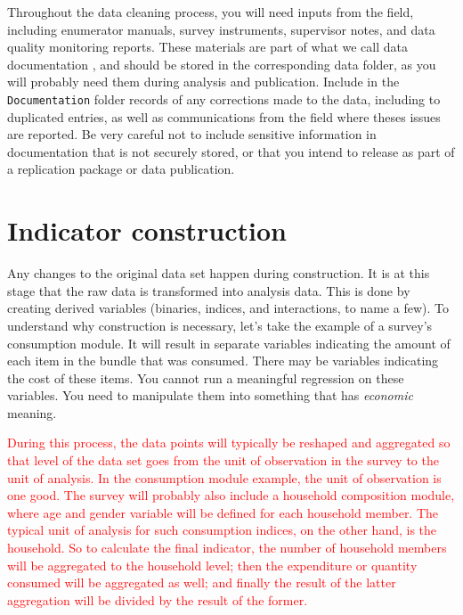 Throughout the data cleaning process, you will need inputs from the field, 
including enumerator manuals, survey instruments, 
supervisor notes, and data quality monitoring reports.
These materials are part of what we call data documentation
,
and should be stored in the corresponding data folder, 
as you will probably need them during analysis and publication.
Include in the \texttt{Documentation} folder records of any
corrections made to the data, including to duplicated entries,
as well as communications from the field where theses issues are reported.
Be very careful not to include sensitive information in 
documentation that is not securely stored, 
or that you intend to release as part of a replication package or data publication.

\section{Indicator construction}

Any changes to the original data set happen during construction.
It is at this stage that the raw data is transformed into analysis data.
This is done by creating derived variables
(binaries, indices, and interactions, to name a few).
To understand why construction is necessary,
let's take the example of a survey's consumption module.
It will result in separate variables indicating the 
amount of each item in the bundle that was consumed.
There may be variables indicating the cost of these items.
You cannot run a meaningful regression on these variables. 
You need to manipulate them into something that has \textit{economic} meaning. 

\textcolor{red}{During this process, the data points will typically be reshaped and aggregated 
so that level of the data set goes from the unit of observation in the survey to the unit of analysis. 
In the consumption module example, the unit of observation is one good. 
The survey will probably also include a household composition module,
where age and gender variable will be defined for each household member.
The typical unit of analysis for such consumption indices, on the other hand, is the household.
So to calculate the final indicator, 
the number of household members will be aggregated to the household level;
then the expenditure or quantity consumed will be aggregated as well;
and finally the result of the latter aggregation will be divided by the result of the former.}

